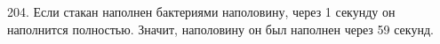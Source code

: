 204. Если стакан наполнен бактериями наполовину, через 1 секунду он наполнится полностью. Значит, наполовину он был наполнен через 59 секунд.\\
